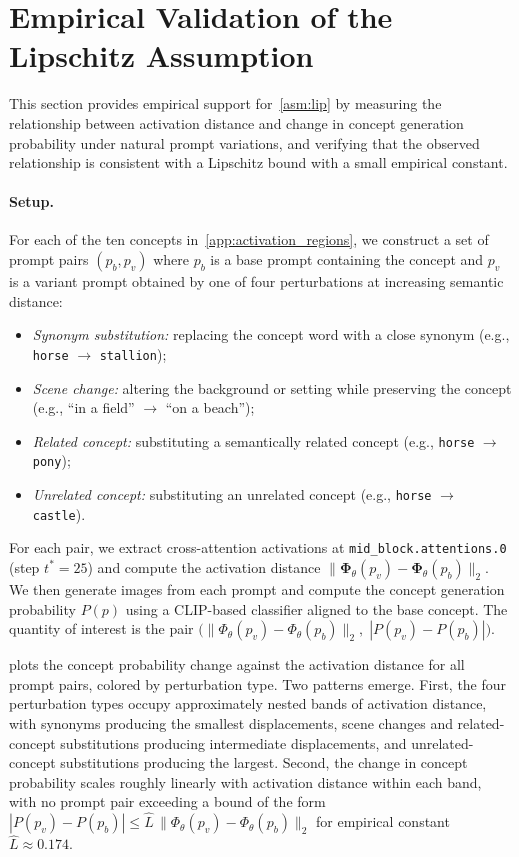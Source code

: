 \section{Empirical Validation of the Lipschitz Assumption}
\label{app:lipschitz}
This section provides empirical support for~\cref{asm:lip} by measuring the relationship between activation distance and change in concept generation probability under natural prompt variations, and verifying that the observed relationship is consistent with a Lipschitz bound with a small empirical constant.

\paragraph{Setup.}
For each of the ten concepts in~\cref{app:activation_regions}, we construct a set of prompt pairs $(p_b, p_v)$ where $p_b$ is a base prompt containing the concept and $p_v$ is a variant prompt obtained by one of four perturbations at increasing semantic distance:
\begin{itemize}
    \item \emph{Synonym substitution:} replacing the concept word with a close synonym (e.g., \texttt{horse} $\to$ \texttt{stallion});
    \item \emph{Scene change:} altering the background or setting while preserving the concept (e.g., ``in a field'' $\to$ ``on a beach'');
    \item \emph{Related concept:} substituting a semantically related concept (e.g., \texttt{horse} $\to$ \texttt{pony});
    \item \emph{Unrelated concept:} substituting an unrelated concept (e.g., \texttt{horse} $\to$ \texttt{castle}).
\end{itemize}
For each pair, we extract cross-attention activations at \texttt{mid\_block.attentions.0} (step $t^*{=}25$) and compute the activation distance $\|\boldsymbol{\Phi}_\theta(p_v) - \boldsymbol{\Phi}_\theta(p_b)\|_2$. We then generate images from each prompt and compute the concept generation probability $P(p)$ using a CLIP-based classifier aligned to the base concept. The quantity of interest is the pair $\bigl(\|\Phi_\theta(p_v) - \Phi_\theta(p_b)\|_2,\;|P(p_v) - P(p_b)|\bigr)$.

 plots the concept probability change against the activation distance for all prompt pairs, colored by perturbation type. Two patterns emerge. First, the four perturbation types occupy approximately nested bands of activation distance, with synonyms producing the smallest displacements, scene changes and related-concept substitutions producing intermediate displacements, and unrelated-concept substitutions producing the largest. Second, the change in concept probability scales roughly linearly with activation distance within each band, with no prompt pair exceeding a bound of the form $|P(p_v) - P(p_b)| \leq \hat{L} \,\|\Phi_\theta(p_v) - \Phi_\theta(p_b)\|_2$ for empirical constant $\hat{L} \approx 0.174$.

